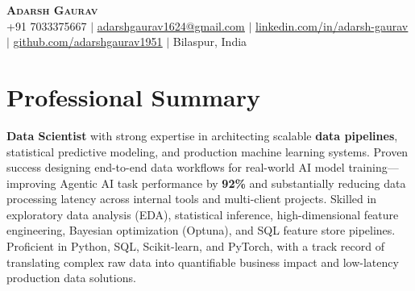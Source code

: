 \documentclass[letterpaper,10pt]{article}
\begin{document}
\begin{center}
    \textbf{\Huge \scshape Adarsh Gaurav} \\ \vspace{2pt}
    \small +91 7033375667 $|$ 
    \href{mailto:adarshgaurav1624@gmail.com}{\underline{adarshgaurav1624@gmail.com}} $|$ 
    \href{https://linkedin.com/in/adarsh-gaurav}{\underline{linkedin.com/in/adarsh-gaurav}} $|$ 
    \href{https://github.com/adarshgaurav1951}{\underline{github.com/adarshgaurav1951}} $|$
    Bilaspur, India
\end{center}

\section{Professional Summary}
\small{
  \textbf{Data Scientist} with strong expertise in architecting scalable \textbf{data pipelines}, statistical predictive modeling, and production machine learning systems. Proven success designing end-to-end data workflows for real-world AI model training---improving Agentic AI task performance by \textbf{92\%} and substantially reducing data processing latency across internal tools and multi-client projects. Skilled in exploratory data analysis (EDA), statistical inference, high-dimensional feature engineering, Bayesian optimization (Optuna), and SQL feature store pipelines. Proficient in Python, SQL, Scikit-learn, and PyTorch, with a track record of translating complex raw data into quantifiable business impact and low-latency production data solutions.
}

\end{document}
